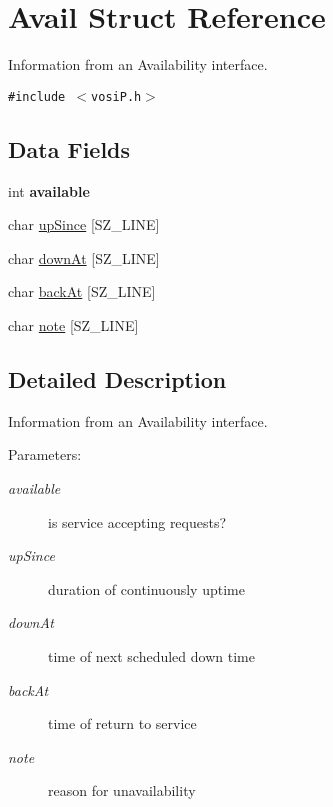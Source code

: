 \hypertarget{structAvail}{
\section{Avail Struct Reference}
\label{structAvail}
}
Information from an Availability interface.  


{\tt \#include $<$vosiP.h$>$}

\subsection*{Data Fields}
\begin{CompactItemize}
\item 
\hypertarget{structAvail_a4b9dd180b028520579ca3cf23185ecc}{
int \textbf{available}}
\label{structAvail_a4b9dd180b028520579ca3cf23185ecc}

\item 
char \hyperlink{structAvail_190f6558dc397d810a41f6c3f23b0fe6}{upSince} \mbox{[}SZ\_\-LINE\mbox{]}
\item 
char \hyperlink{structAvail_f997dc41238dc4355927949c44c931ef}{downAt} \mbox{[}SZ\_\-LINE\mbox{]}
\item 
char \hyperlink{structAvail_8baad63d1401b54bc8fcf4e4a880746a}{backAt} \mbox{[}SZ\_\-LINE\mbox{]}
\item 
char \hyperlink{structAvail_c365e387923dbc6eaae135e942a8edb2}{note} \mbox{[}SZ\_\-LINE\mbox{]}
\end{CompactItemize}


\subsection{Detailed Description}
Information from an Availability interface. 

\begin{Desc}
\item[Parameters:]
\begin{description}
\item[{\em available}]is service accepting requests? \item[{\em upSince}]duration of continuously uptime \item[{\em downAt}]time of next scheduled down time \item[{\em backAt}]time of return to service \item[{\em note}]reason for unavailability \end{description}
\end{Desc}


